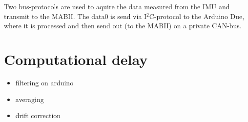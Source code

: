 \documentclass[ExampleMasters.tex]{subfiles}
\begin{document}
Two bus-protocols are used to aquire the data measured from the IMU and transmit  to the MABII. The data0 is send via I$^2$C-protocol to the Arduino Due, where it is processed and then send out (to the MABII) on a private CAN-bus. 

\section{Computational delay}
\label{sec:computational_delay}
\begin{itemize}
	\item filtering on arduino
	\item averaging
	\item drift correction
	
\end{itemize}
\end{document}
